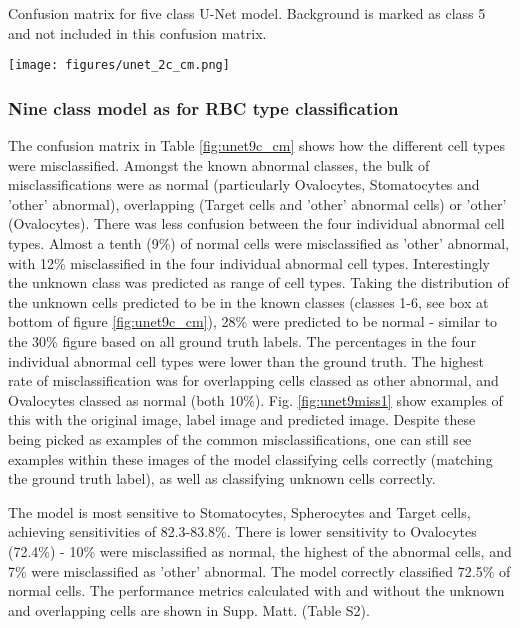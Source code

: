 \documentclass[final,5p,times,twocolumn,authoryear]{elsarticle}
\begin{document}
\begin{table}[t!]
	\caption[U-Net 5 class: Confusion matrix]{Confusion matrix for five class U-Net model. Background is marked as class 5 and not included in this confusion matrix.}
	\centering
	\texttt{[image: figures/unet\_2c\_cm.png]}
	\label{fig:unet2c_cm}
\end{table}


\subsubsection{Nine class model as for RBC type classification}
\label{subsubsec:9c_pred}

The confusion matrix in Table \ref{fig:unet9c_cm} shows how the different cell types were misclassified.
Amongst the known abnormal classes, the bulk of misclassifications were as normal (particularly Ovalocytes, Stomatocytes and 'other' abnormal), overlapping (Target cells and 'other' abnormal cells) or 'other' (Ovalocytes). There was less confusion between the four individual abnormal cell types.
Almost a tenth (9\%) of normal cells were misclassified as 'other' abnormal, with 12\% misclassified in the four individual abnormal cell types. Interestingly the unknown class was predicted as range of cell types. Taking the distribution of the unknown cells predicted to be in the known classes (classes 1-6, see box at bottom of figure \ref{fig:unet9c_cm}), 28\% were predicted to be normal - similar to the 30\% figure based on all ground truth labels. The percentages in the four individual abnormal cell types were lower than the ground truth. The highest rate of misclassification was for overlapping cells classed as other abnormal, and Ovalocytes classed as normal (both 10\%). Fig. \ref{fig:unet9miss1} show examples of this with the original image, label image and predicted image. Despite these being picked as examples of the common misclassifications, one can still see examples within these images of the model classifying cells correctly (matching the ground truth label), as well as classifying unknown cells correctly. 

The model is most sensitive to Stomatocytes, Spherocytes and Target cells, achieving sensitivities of 82.3-83.8\%. There is lower sensitivity to Ovalocytes (72.4\%) - 10\% were misclassified as normal, the highest of the abnormal cells, and 7\% were misclassified as 'other' abnormal. The model correctly classified 72.5\% of normal cells. The performance metrics calculated with and without the unknown and overlapping cells are shown in Supp. Matt. (Table S2).
\end{document}

